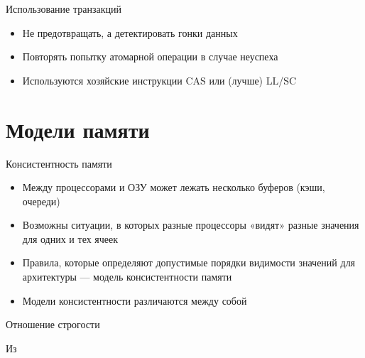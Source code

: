 \documentclass{beamer}
\begin{document}
\begin{frame}{Использование транзакций}
    \begin{itemize}
        \item Не предотвращать, а детектировать гонки данных
        \item Повторять попытку атомарной операции в случае неуспеха
        \item Используются хозяйские инструкции CAS или (лучше) LL/SC
    \end{itemize}
\end{frame}

\section{Модели памяти}

\begin{frame}{Консистентность памяти}
\begin{itemize}
    \item Между процессорами и ОЗУ может лежать несколько буферов (кэши, очереди)
    \item Возможны ситуации, в которых разные процессоры «видят» разные значения для одних и тех ячеек
    \item Правила, которые определяют допустимые порядки видимости значений для архитектуры — модель консистентности памяти \pause
    \item Модели консистентности различаются между собой
\end{itemize}

\end{frame}

\begin{frame}{Отношение строгости}

Из~\cite{consistency-report}

\centering

\end{frame}
\end{document}
